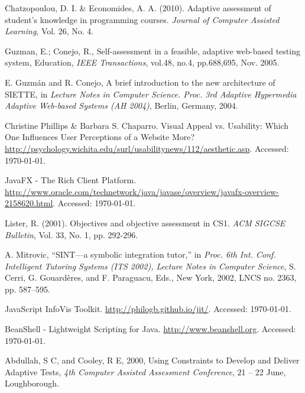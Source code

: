 \begin{thebibliography}{9}
 Chatzopoulou, D. I. \& Economides, A. A. (2010). Adaptive assessment of student's knowledge in programming courses. \textit{Journal of Computer Assisted Learning}, Vol. 26, No. 4.

 Guzman, E.; Conejo, R., Self-assessment in a feasible, adaptive web-based testing system, Education, \textit{IEEE Transactions}, vol.48, no.4, pp.688,695, Nov. 2005.

 E. Guzmán and R. Conejo, A brief introduction to the new architecture of SIETTE, in \textit{Lecture Notes in Computer Science. Proc. 3rd Adaptive Hypermedia Adaptive Web-based Systems (AH 2004)}, Berlin, Germany,
2004.

 Christine Phillips \& Barbara S. Chaparro. Visual Appeal vs. Usability: Which One Influences User Perceptions of a Website More? \url{http://psychology.wichita.edu/surl/usabilitynews/112/aesthetic.asp}. Accessed: \today.

 JavaFX - The Rich Client Platform. \url{http://www.oracle.com/technetwork/java/javase/overview/javafx-overview-2158620.html}. Accessed: \today.

 Lister, R. (2001). Objectives and objective assessment in CS1. \textit{ACM SIGCSE Bulletin}, Vol. 33, No. 1, pp. 292-296.

 A. Mitrovic, “SINT—a symbolic integration tutor,” in \textit{Proc. 6th Int. Conf. Intelligent Tutoring Systems (ITS 2002), Lecture Notes in Computer
Science}, S. Cerri, G. Gouardères, and F. Paraguacu, Eds., New York, 2002, LNCS no. 2363, pp. 587–595.

 JavaScript InfoVis Toolkit. \url{http://philogb.github.io/jit/}. Accessed: \today.

 BeanShell - Lightweight Scripting for Java. \url{http://www.beanshell.org}. Accessed: \today.

 Abdullah, S C, and Cooley, R E, 2000, Using Constraints to Develop and Deliver Adaptive Tests, \textit{4th Computer Assisted Assessment Conference}, 21 – 22 June, Loughborough.

\end{thebibliography}